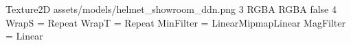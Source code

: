 Texture2D
assets/models/helmet_showroom_ddn.png
3
RGBA
RGBA
false
4
WrapS = Repeat
WrapT = Repeat
MinFilter = LinearMipmapLinear
MagFilter = Linear
